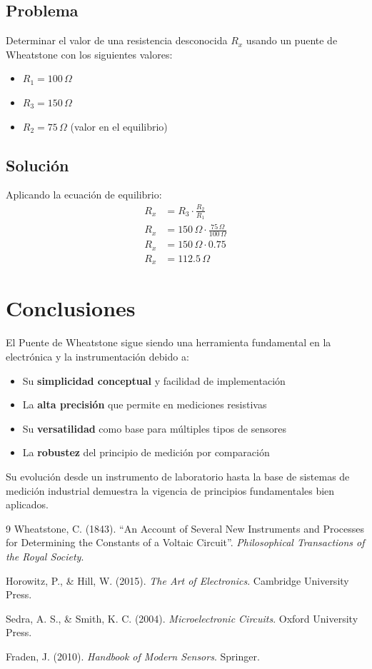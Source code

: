 \documentclass{article}
\begin{document}
\subsection{Problema}
Determinar el valor de una resistencia desconocida $R_x$ usando un puente de Wheatstone con los siguientes valores:
\begin{itemize}
    \item $R_1 = 100\,\Omega$
    \item $R_3 = 150\,\Omega$
    \item $R_2 = 75\,\Omega$ (valor en el equilibrio)
\end{itemize}

\subsection{Solución}
Aplicando la ecuación de equilibrio:
\begin{align*}
R_x &= R_3 \cdot \frac{R_2}{R_1} \\
R_x &= 150\,\Omega \cdot \frac{75\,\Omega}{100\,\Omega} \\
R_x &= 150\,\Omega \cdot 0.75 \\
R_x &= 112.5\,\Omega
\end{align*}

\section{Conclusiones}

El Puente de Wheatstone sigue siendo una herramienta fundamental en la electrónica y la instrumentación debido a:
\begin{itemize}
    \item Su \textbf{simplicidad conceptual} y facilidad de implementación
    \item La \textbf{alta precisión} que permite en mediciones resistivas
    \item Su \textbf{versatilidad} como base para múltiples tipos de sensores
    \item La \textbf{robustez} del principio de medición por comparación
\end{itemize}

Su evolución desde un instrumento de laboratorio hasta la base de sistemas de medición industrial demuestra la vigencia de principios fundamentales bien aplicados.

\newpage
\begin{thebibliography}{9}
Wheatstone, C. (1843). ``An Account of Several New Instruments and Processes for Determining the Constants of a Voltaic Circuit''. \emph{Philosophical Transactions of the Royal Society}.

Horowitz, P., \& Hill, W. (2015). \emph{The Art of Electronics}. Cambridge University Press.

Sedra, A. S., \& Smith, K. C. (2004). \emph{Microelectronic Circuits}. Oxford University Press.

Fraden, J. (2010). \emph{Handbook of Modern Sensors}. Springer.
\end{thebibliography}
\end{document}

